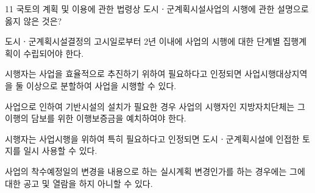 \begin{question}{11}
국토의 계획 및 이용에 관한 법령상 도시ㆍ군계획시설사업의 시행에 관한 설명으로 옳지 않은 것은?
\begin{choices}
  \item 도시ㆍ군계획시설결정의 고시일로부터 2년 이내에 사업의 시행에 대한 단계별 집행계획이 수립되어야 한다.
  \item 시행자는 사업을 효율적으로 추진하기 위하여 필요하다고 인정되면 사업시행대상지역을 둘 이상으로 분할하여 사업을 시행할 수 있다.
  \item 사업으로 인하여 기반시설의 설치가 필요한 경우 사업의 시행자인 지방자치단체는 그 이행의 담보를 위한 이행보증금을 예치하여야 한다.
  \item 시행자는 사업시행을 위하여 특히 필요하다고 인정되면 도시ㆍ군계획시설에 인접한 토지를 일시 사용할 수 있다.
  \item 사업의 착수예정일의 변경을 내용으로 하는 실시계획 변경인가를 하는 경우에는 그에 대한 공고 및 열람을 하지 아니할 수 있다.
\end{choices}
\end{question}
